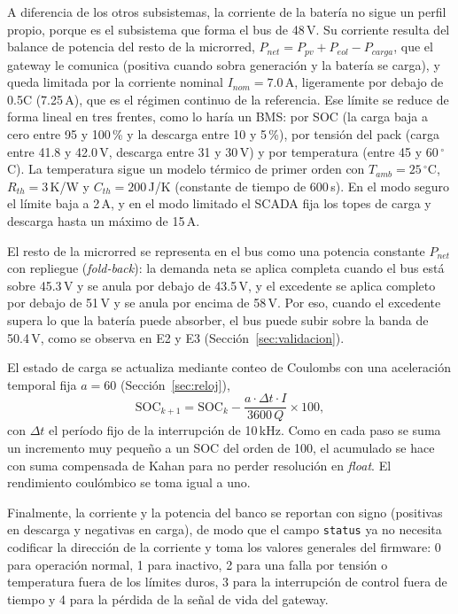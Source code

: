 \documentclass[conference]{IEEEtran}
\begin{document}
A diferencia de los otros subsistemas, la corriente de la batería no sigue un perfil propio, porque es el subsistema que forma el bus de 48\,V. Su corriente resulta del balance de potencia del resto de la microrred, $P_{net}=P_{pv}+P_{eol}-P_{carga}$, que el gateway le comunica (positiva cuando sobra generación y la batería se carga), y queda limitada por la corriente nominal $I_{nom}=7.0$\,A, ligeramente por debajo de 0.5C (7.25\,A), que es el régimen continuo de la referencia. Ese límite se reduce de forma lineal en tres frentes, como lo haría un BMS: por SOC (la carga baja a cero entre 95 y 100\,\% y la descarga entre 10 y 5\,\%), por tensión del pack (carga entre 41.8 y 42.0\,V, descarga entre 31 y 30\,V) y por temperatura (entre 45 y 60\,$^{\circ}$C). La temperatura sigue un modelo térmico de primer orden con $T_{amb}=25\,^{\circ}$C, $R_{th}=3$\,K/W y $C_{th}=200$\,J/K (constante de tiempo de 600\,s). En el modo seguro el límite baja a 2\,A, y en el modo limitado el SCADA fija los topes de carga y descarga hasta un máximo de 15\,A.

El resto de la microrred se representa en el bus como una potencia constante $P_{net}$ con repliegue (\emph{fold-back}): la demanda neta se aplica completa cuando el bus está sobre 45.3\,V y se anula por debajo de 43.5\,V, y el excedente se aplica completo por debajo de 51\,V y se anula por encima de 58\,V. Por eso, cuando el excedente supera lo que la batería puede absorber, el bus puede subir sobre la banda de 50.4\,V, como se observa en E2 y E3 (Sección~\ref{sec:validacion}).

El estado de carga se actualiza mediante conteo de Coulombs con una aceleración temporal fija $a=60$ (Sección~\ref{sec:reloj}),
\begin{equation}
\label{eq:bat_SOC}
\mathrm{SOC}_{k+1} = \mathrm{SOC}_k - \frac{a \cdot \Delta t \cdot I}{3600\,Q}\times 100,
\end{equation}
con $\Delta t$ el período fijo de la interrupción de 10\,kHz. Como en cada paso se suma un incremento muy pequeño a un SOC del orden de 100, el acumulado se hace con suma compensada de Kahan para no perder resolución en \emph{float}. El rendimiento coulómbico se toma igual a uno.

Finalmente, la corriente y la potencia del banco se reportan con signo (positivas en descarga y negativas en carga), de modo que el campo \texttt{status} ya no necesita codificar la dirección de la corriente y toma los valores generales del firmware: 0 para operación normal, 1 para inactivo, 2 para una falla por tensión o temperatura fuera de los límites duros, 3 para la interrupción de control fuera de tiempo y 4 para la pérdida de la señal de vida del gateway.
\end{document}
